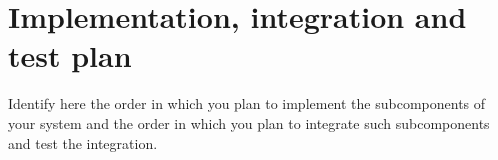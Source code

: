 \section{Implementation, integration and test plan}
\label{sect:implementationintegrationandtestplan}

Identify here the order in which you plan to implement the subcomponents of your system and the order in which you plan to integrate such subcomponents and test the integration. 